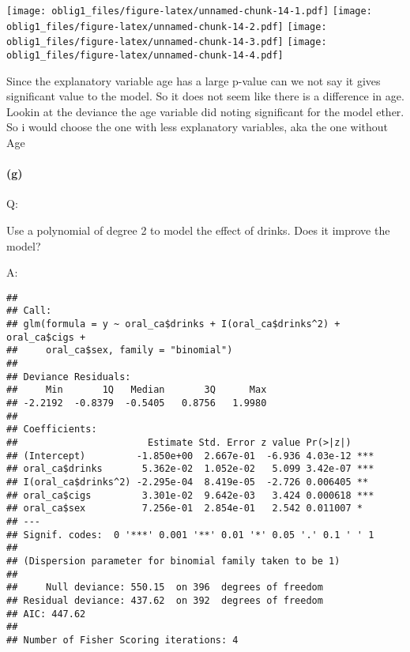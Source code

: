 \documentclass[
]{article}
\newenvironment{Shaded}{\begin{snugshade}}{\end{snugshade}}
\newcommand{\DataTypeTok}[1]{\textcolor[rgb]{0.13,0.29,0.53}{#1}}
\newcommand{\DecValTok}[1]{\textcolor[rgb]{0.00,0.00,0.81}{#1}}
\newcommand{\KeywordTok}[1]{\textcolor[rgb]{0.13,0.29,0.53}{\textbf{#1}}}
\newcommand{\NormalTok}[1]{#1}
\newcommand{\OperatorTok}[1]{\textcolor[rgb]{0.81,0.36,0.00}{\textbf{#1}}}
\newcommand{\StringTok}[1]{\textcolor[rgb]{0.31,0.60,0.02}{#1}}
\begin{document}
\texttt{[image: oblig1\_files/figure-latex/unnamed-chunk-14-1.pdf]}
\texttt{[image: oblig1\_files/figure-latex/unnamed-chunk-14-2.pdf]}
\texttt{[image: oblig1\_files/figure-latex/unnamed-chunk-14-3.pdf]}
\texttt{[image: oblig1\_files/figure-latex/unnamed-chunk-14-4.pdf]}

Since the explanatory variable age has a large p-value can we not say it
gives significant value to the model. So it does not seem like there is
a difference in age. Lookin at the deviance the age variable did noting
significant for the model ether. So i would choose the one with less
explanatory variables, aka the one without Age

\hypertarget{g}{%
\paragraph{(g)}\label{g}}

Q:

Use a polynomial of degree 2 to model the effect of drinks. Does it
improve the model?

A:

\begin{Shaded}
\end{Shaded}

\begin{verbatim}
## 
## Call:
## glm(formula = y ~ oral_ca$drinks + I(oral_ca$drinks^2) + oral_ca$cigs + 
##     oral_ca$sex, family = "binomial")
## 
## Deviance Residuals: 
##     Min       1Q   Median       3Q      Max  
## -2.2192  -0.8379  -0.5405   0.8756   1.9980  
## 
## Coefficients:
##                       Estimate Std. Error z value Pr(>|z|)    
## (Intercept)         -1.850e+00  2.667e-01  -6.936 4.03e-12 ***
## oral_ca$drinks       5.362e-02  1.052e-02   5.099 3.42e-07 ***
## I(oral_ca$drinks^2) -2.295e-04  8.419e-05  -2.726 0.006405 ** 
## oral_ca$cigs         3.301e-02  9.642e-03   3.424 0.000618 ***
## oral_ca$sex          7.256e-01  2.854e-01   2.542 0.011007 *  
## ---
## Signif. codes:  0 '***' 0.001 '**' 0.01 '*' 0.05 '.' 0.1 ' ' 1
## 
## (Dispersion parameter for binomial family taken to be 1)
## 
##     Null deviance: 550.15  on 396  degrees of freedom
## Residual deviance: 437.62  on 392  degrees of freedom
## AIC: 447.62
## 
## Number of Fisher Scoring iterations: 4
\end{verbatim}
\end{document}
